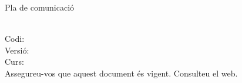 \begin{titlepage}\sffamily

\begin{center}
 
\begin{minipage}{.8\linewidth}
\raggedright
\noindent
{\color{blau}%
\vspace{8\baselineskip}
{\Huge\bfseries


{\fontsize{60}{70}\selectfont Pla de comunicació}\\[6ex]

\curs \\
\vspace{2\baselineskip}
\noindent
}}%
\end{minipage}
\end{center}



\vspace{4\baselineskip}
\raggedright
\vspace{\baselineskip}
\begin{center}
\let\footnoterule\relax
\begin{minipage}{.8\linewidth}\large
Codi: \codi\\
Versió: \versio\\
Curs:  \curs \\[3ex]
{\color{gray}\small{Assegureu-vos que aquest document és vigent. Consulteu el web.}} \\
\end{minipage}
\end{center}
\vfill
\bigskip

\end{titlepage}

\clearpage